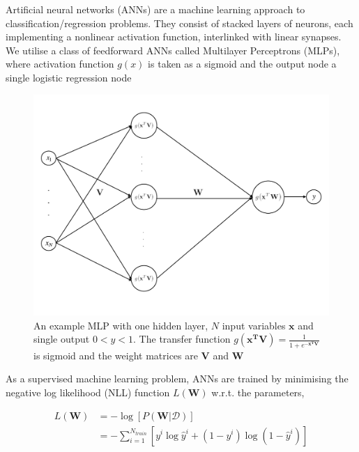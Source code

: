 
Artificial neural networks (ANNs) are a machine learning approach to classification/regression problems. They consist of stacked layers of neurons, each implementing a nonlinear activation function, interlinked with linear synapses. 
We utilise a class of feedforward ANNs called Multilayer Perceptrons (MLPs), where activation function $g(x)$ is taken as a sigmoid and the output node a single logistic regression node

\begin{figure}[htbp]
	\centering
		\includegraphics[width=0.7\linewidth]{img/ann_diag}
	\caption{An example MLP with one hidden layer, $N$ input variables $\mathbf{x}$ and single output $ 0 < y < 1$. The transfer function  $ g(\mathbf{x^T V}) = \frac{1}{1+e^{-\mathbf{x^TV}}}$  is sigmoid and the weight matrices are \textbf{V} and \textbf{W} }
	\label{ann_diag}
\end{figure}  

As a supervised machine learning problem, ANNs are trained by minimising the negative log likelihood (NLL) function $L(\mathbf{W})$ w.r.t. the parameters, 

\begin{align}
	L(\mathbf{W}) &= -\log\left[ P(\mathbf{W} | \mathcal{D}) \right] \\
				  &= -\sum_{i = 1}^{N_{train}} \left[ y^i\log \hat{y}^i + (1-y^i)\log(1-\hat{y}^i)\right]
\end{align}

